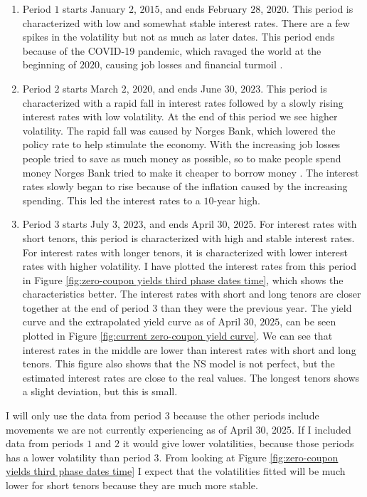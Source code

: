 \begin{enumerate}
    \item Period $1$ starts January $2$, $2015$, and ends February $28$, $2020$. This period is characterized with low and somewhat stable interest rates. There are a few spikes in the volatility but not as much as later dates. This period ends because of the COVID-19 pandemic, which ravaged the world at the beginning of $2020$, causing job losses and financial turmoil \cite{norges_bank_covid}.
    \item Period $2$ starts March $2$, $2020$, and ends June $30$, $2023$. This period is characterized with a rapid fall in interest rates followed by a slowly rising interest rates with low volatility. At the end of this period we see higher volatility. The rapid fall was caused by Norges Bank, which lowered the policy rate to help stimulate the economy. With the increasing job losses people tried to save as much money as possible, so to make people spend money Norges Bank tried to make it cheaper to borrow money \cite{nrk_covid}. The interest rates slowly began to rise because of the inflation caused by the increasing spending. This led the interest rates to a $10$-year high.
    \item Period $3$ starts July $3$, $2023$, and ends April $30$, $2025$. For interest rates with short tenors, this period is characterized with high and stable interest rates. For interest rates with longer tenors, it is characterized with lower interest rates with higher volatility. I have plotted the interest rates from this period in Figure \ref{fig:zero-coupon yields third phase dates time}, which shows the characteristics better. The interest rates with short and long tenors are closer together at the end of period $3$ than they were the previous year. The yield curve and the extrapolated yield curve as of April $30$, $2025$, can be seen plotted in Figure \ref{fig:current zero-coupon yield curve}. We can see that interest rates in the middle are lower than interest rates with short and long tenors. This figure also shows that the NS model is not perfect, but the estimated interest rates are close to the real values. The longest tenors shows a slight deviation, but this is small.
\end{enumerate}

I will only use the data from period $3$ because the other periods include movements we are not currently experiencing as of April $30$, 2025. If I included data from periods $1$ and $2$ it would give lower volatilities, because those periods has a lower volatility than period 3. From looking at Figure \ref{fig:zero-coupon yields third phase dates time} I expect that the volatilities fitted will be much lower for short tenors because they are much more stable.

